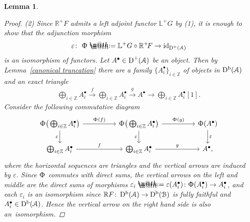 \documentclass[pdftex]{sigma}%
\makeatletter
\newtheorem{lem}[dfn]{Lemma}
\newcommand*{\defeq}{\mathrel{\rlap{%
 \raisebox{0.3ex}{$\m@th\cdot$}}%
 \raisebox{-0.3ex}{$\m@th\cdot$}}%
 =}
\numberwithin{equation}{section}
\newcommand{\Db}{\operatorname{D^b}}
\newcommand{\D}{\operatorname{D}}
\newcommand{\id}{\operatorname{id}}
\newcommand{\bL}{\mathbb{L}}
\newcommand{\bR}{\mathbb{R}}
\newcommand{\bZ}{\mathbb{Z}}
\newcommand{\scrA}{\EuScript{A}}
\newcommand{\scrB}{\EuScript{B}}
\makeatother
\begin{document}
\begin{lem}
\begin{proof}
(2) Since $\bR^+\!F$ admits a left adjoint functor $\bL^+G$ by (1), it is enough to show that the adjunction morphism
\begin{gather*}
\varepsilon\colon\ \Upphi\defeq \bL^+G\circ \bR^+\!F\to \id_{\D^+(\scrA)}
\end{gather*}
is an isomorphism of functors. Let $A^{\bullet}\in \D^+(\scrA)$ be an object. Then by Lemma~\ref{canonical truncation} there are a family $\{A^{\bullet}_i\}_{i\in\bZ}$ of objects in $\Db(\scrA)$ and an exact triangle
\begin{gather*}
\bigoplus_{i\in \bZ}A^{\bullet}_i\xrightarrow{f} \bigoplus_{i\in \bZ}A^{\bullet}_i\xrightarrow{g} A^{\bullet}\to \bigoplus_{i\in \bZ}A^{\bullet}_i[1].
\end{gather*}
Consider the following commutative diagram
\[
\begin{tikzcd}
\Upphi\big(\bigoplus_{i\in \bZ}A^{\bullet}_i\big)\arrow[rr, "\Upphi(f)"]\arrow[d, "\varepsilon"']&&\Upphi\big(\bigoplus_{i\in \bZ}A^{\bullet}_i\big)\arrow[rr, "\Upphi(g)"]\arrow[d, "\varepsilon"']&&\Upphi(A^{\bullet})\arrow[d, "\varepsilon"]
\\
\bigoplus_{i\in \bZ}A^{\bullet}_i\arrow[rr, "f"]&&\bigoplus_{i\in \bZ}A^{\bullet}_i\arrow[rr, "g"]&&A^{\bullet},
\end{tikzcd}
\]
where the horizontal sequences are triangles and the vertical arrows are induced by $\varepsilon$. Since $\Upphi$ commutes with direct sums, the vertical arrows on the left and middle are the direct sums of morphisms $\varepsilon_i\defeq\varepsilon(A_i^{\bullet})\colon\Upphi(A_i^{\bullet})\to A_i^{\bullet}$, and each $\varepsilon_i$ is an isomorphism since $\bR F\colon \Db(\scrA)\to\Db(\scrB)$ is fully faithful and $A_i^{\bullet}\in\Db(\scrA)$. Hence the vertical arrow on the right hand side is also an~iso\-morphism.
\end{proof}
\end{lem}
\end{document}
